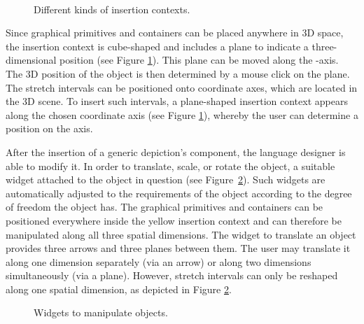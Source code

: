 \documentclass[a4paper]{article}
\begin{document}
\begin{figure}[!ht]
 \begin{center}
  \\
 \end{center}
\caption{Different kinds of insertion contexts.}
\label{fig:insCont}
\end{figure}

Since graphical primitives and containers can be placed anywhere in 3D space, the insertion context is cube-shaped and includes a plane to indicate a three-dimensional position (see Figure \ref{fig:insCont}). This plane can be moved along the -axis. The 3D position of the object is then determined by a mouse click on the plane. The stretch intervals can be positioned onto coordinate axes, which are located in the 3D scene. To insert such intervals, a plane-shaped insertion context appears along the chosen coordinate axis (see Figure \ref{fig:insCont}), whereby the user can determine a position on the axis.

After the insertion of a generic depiction's component, the language designer is able to modify it. In order to translate, scale, or rotate the object, a suitable widget attached to the object in question (see Figure~\ref{fig:widgets}). Such widgets are automatically adjusted to the requirements of the object according to the degree of freedom the object has. The graphical primitives and containers can be positioned everywhere inside the yellow insertion context and can therefore be manipulated along all three spatial dimensions. The widget to translate an object provides three arrows and three planes between them. The user may translate it along one dimension separately (via an arrow) or along two dimensions simultaneously (via a plane). However, stretch intervals can only be reshaped along one spatial dimension, as depicted in Figure \ref{fig:widgets}.

\begin{figure}[!ht]
 \centerline{
  \hfil
  \hfil
  \hfil
 }
\caption{Widgets to manipulate objects.}
\label{fig:widgets}
\end{figure}
\end{document}
